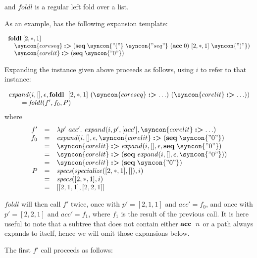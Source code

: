 \documentclass{kththesis}
\begin{document}
and $\mathit{foldl}$ is a regular left fold over a list.

As an example,  has the following expansion template:

$$
\begin{array}{l}
\foldl [2, *, 1] \\
\quad \syncon{coreseq} \tagged (\seq \syncon{"("}\ \syncon{"seq"}\ (\acc 0)\ [2, *, 1]\ \syncon{")"}) \\
\quad \syncon{corelit} \tagged (\seq \syncon{"0"}) \\
\end{array}
$$

Expanding the instance given above proceeds as follows, using $i$ to refer to that instance:

$$
\begin{array}{l}
\expand(i, [], \epsilon, \foldl~[2, *, 1]~(\syncon{coreseq} \tagged \ldots)~(\syncon{corelit} \tagged \ldots)) \\
\qquad = \mathit{foldl}(f', f_0, P) \\
\end{array}
$$
where
$$
\begin{array}{rcl}
f' & = & \lambda p'~acc'.~ \expand(i, p', [acc'], \syncon{corelit} \tagged \ldots) \\
f_0 & = & \expand(i, [], \epsilon, \syncon{corelit} \tagged (\seq \syncon{"0"}) \\
& = & \syncon{corelit} \tagged \expand(i, [], \epsilon, \seq \syncon{"0"}) \\
& = & \syncon{corelit} \tagged (\seq \expand(i, [], \epsilon, \syncon{"0"})) \\
& = & \syncon{corelit} \tagged (\seq \syncon{"0"}) \\
P & = & \specs(\specialize([2, *, 1], []), i) \\
& = & \specs([2, *, 1], i) \\
& = & [[2, 1, 1], [2, 2, 1]] \\
\end{array}
$$

$\mathit{foldl}$ will then call $f'$ twice, once with $p' = [2, 1, 1]$ and $acc' = f_0$, and once with $p' = [2, 2, 1]$ and $acc' = f_1$, where $f_1$ is the result of the previous call. It is here useful to note that a subtree that does not contain either $\mathrel{\mathbf{acc}}~n$ or a path always expands to itself, hence we will omit those expansions below.

The first $f'$ call proceeds as follows:
\end{document}

